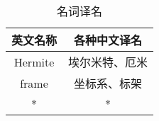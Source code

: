 
\begin{table}[ht]
\centering
\caption{名词译名}\label{text_tab1}
\begin{tabular}{|c|c|}
\hline
英文名称 & 各种中文译名 \\
\hline
Hermite & 埃尔米特、厄米 \\
\hline
frame & 坐标系、标架 \\
\hline
* & * \\
\hline
\end{tabular}
\end{table}